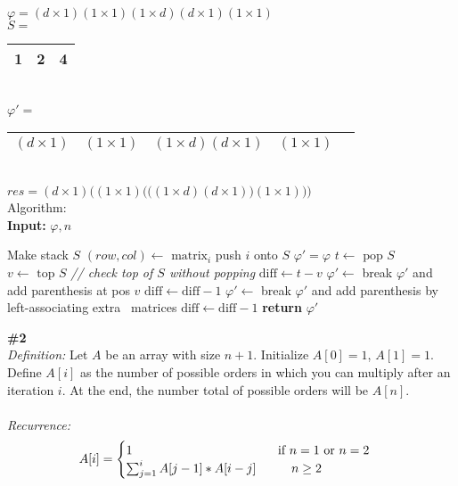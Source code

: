 \documentclass{article}
\newcommand\tab[1][1cm]{\hspace*{#1}}
\begin{document}
\newpage
$\varphi = (d \times 1)(1 \times 1)(1 \times d)(d \times 1)(1 \times 1)$
\\
$S = $
\begin{tabular}{ |c|c|c| } 
 \hline
 1 & 2 & 4\\
 \hline
\end{tabular}
\\
$\varphi' = $
\begin{tabular}{ |c|c|c|c|c } 
 \hline
 $(d \times 1)$ & $(1 \times 1)$ & $(1 \times d)(d \times 1)$ & $(1 \times 1)$ \\
 \hline
\end{tabular}
\\
$res = (d \times 1) \bigg((1 \times 1) \bigg( \bigg( (1 \times d) (d \times 1) \bigg) (1 \times 1) \bigg) \bigg) $
\\
Algorithm:\\
\textbf{Input:} $\varphi, n$
\begin{algorithmic}
\State Make stack $S$
  \State $(row, col) \gets \text{ matrix}_i$
    \State push $i$ onto $S$
  \EndIf
\EndFor
\State $\varphi' = \varphi$
  \State $t \gets \text{ pop } S$
  \State $v \gets \text{ top } S$ \textit{// check top of $S$ without popping}
  \State $\text{diff} \gets t - v$
    \State $\varphi' \gets$ break $\varphi'$ and add parenthesis at pos $v$
    \State $\text{diff} \gets \text{diff} - 1$
      \State $\varphi' \gets$ break $\varphi'$ and add parenthesis by left-associating extra \tab\tab\ matrices 
      \State $\text{diff} \gets \text{diff} - 1$
    \EndWhile
  \EndIf
\EndWhile
\State \textbf{return} $\varphi'$
\\
\end{algorithmic}
\textbf{\#2}
\\
\textit{Definition:} Let $A$ be an array with size $n+1$. Initialize $A[0] = 1$, $A[1] = 1$. Define $A[i]$ as the number of possible orders in which you can multiply after an iteration $i$.  At the end, the number total of possible orders will be $A[n]$.
\\
\\
\textit{Recurrence:}
\\
\begin{gather*}
A[i] =
\begin{cases}
1 \tab\tab\tab\tab\text{   } $if $ n = 1 $ or $ n = 2 \\
\sum_{j=1}^{i} A[j-1]*A[i-j] \tab n \geq 2
\end{cases}
\end{gather*}
\end{document}
